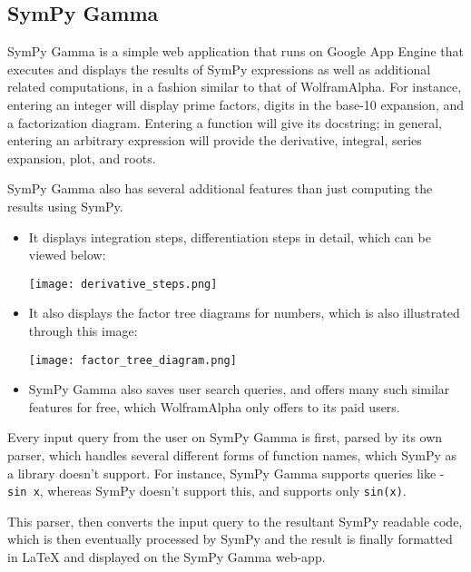 \subsection{SymPy Gamma}\label{sympy-gamma}

SymPy Gamma is a simple web application that runs on Google App Engine 
that executes and displays the results of SymPy expressions as well as
additional related computations, in a fashion similar to that of
Wolfram\textbar{}Alpha. For instance, entering an integer will display
prime factors, digits in the base-10 expansion, and a factorization
diagram. Entering a function will give its docstring; in general,
entering an arbitrary expression will provide the derivative, integral,
series expansion, plot, and roots.

SymPy Gamma also has several additional features than just computing the
results using SymPy.

\begin{itemize}
\item
  It displays integration steps, differentiation steps in detail, which
  can be viewed below:\par
\begin{minipage}{\textwidth}
    \centering
    \texttt{[image: derivative\_steps.png]}
\end{minipage}
\item
  It also displays the factor tree diagrams for numbers, which is also
  illustrated through this image:\par
\begin{minipage}{\textwidth}
    \centering
    \texttt{[image: factor\_tree\_diagram.png]}
\end{minipage}
\item
  SymPy Gamma also saves user search queries, and offers many such 
  similar features for free, which Wolfram\textbar{}Alpha only offers 
  to its paid users.
\end{itemize}
Every input query from the user on SymPy Gamma is first, parsed by its
own parser, which handles several different forms of function names,
which SymPy as a library doesn't support. For instance, SymPy Gamma
supports queries like - \texttt{sin\ x}, whereas SymPy doesn't support
this, and supports only \texttt{sin(x)}.

This parser, then converts the input query to the resultant SymPy
readable code, which is then eventually processed by SymPy and the
result is finally formatted in LaTeX and displayed on the SymPy Gamma
web-app.